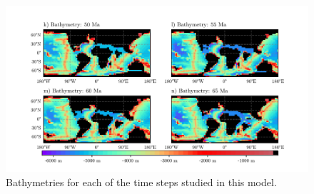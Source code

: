 \documentclass[a4paper]{article}
\begin{document}
\begin{figure}[H]
	\includegraphics[width=\linewidth]{bathymetries_2.pdf}
	\caption{Bathymetries for each of the time steps studied in this model.}
	\label{fig:bathys}
\end{figure}
\end{document}
